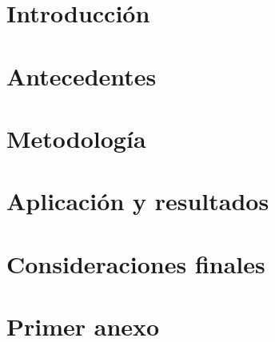 \documentclass[a4paper]{article}
\begin{document}
\newpage

    \section{Introducción}
    \section{Antecedentes}
    \section{Metodología}
    \section{Aplicación y resultados}
    \section{Consideraciones finales}

\appendix
    \section{Primer anexo}
\end{document}

